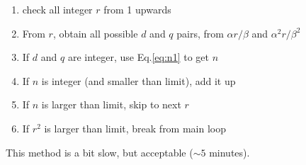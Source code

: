 \documentclass[english]{article}
\begin{document}
\begin{enumerate}
  \item check all integer $r$ from 1 upwards
  \item From $r$, obtain all possible $d$ and $q$ pairs, from $\alpha r/\beta$ and $\alpha^2 r/\beta^2$
  \item If $d$ and $q$ are integer, use Eq.\ref{eq:n1} to get $n$
  \item If $n$ is integer (and smaller than limit), add it up
  \item If $n$ is larger than limit, skip to next $r$
  \item If $r^2$ is larger than limit, break from main loop
\end{enumerate}

This method is a bit slow, but acceptable ($\sim 5$ minutes).
\end{document}
